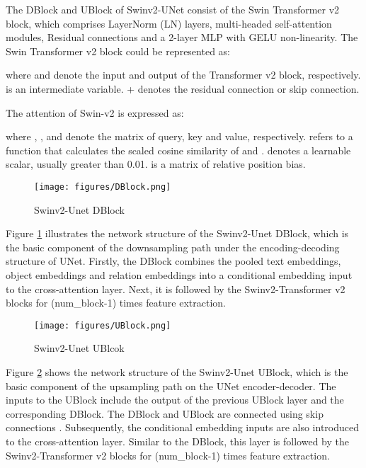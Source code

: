\documentclass{article}
\begin{document}
The DBlock and UBlock of Swinv2-UNet consist of the Swin Transformer v2 block, which comprises LayerNorm (LN) layers, multi-headed self-attention modules, Residual connections and a 2-layer MLP with GELU non-linearity. The Swin Transformer v2 block could be represented as:




where  and  denote the input and output of the Transformer v2 block, respectively.  is an intermediate variable. + denotes the residual connection or skip connection. 

The attention of Swin-v2 is expressed as:


where , , and  denote the matrix of query, key and value, respectively.  refers to a function that calculates the scaled cosine similarity of  and .  denotes a learnable scalar, usually greater than 0.01.  is a matrix of relative position bias.

\begin{figure}[!h]
    \centering
    \texttt{[image: figures/DBlock.png]}
    \caption{Swinv2-Unet DBlock}
    \label{fig:dbloc}
\end{figure}

Figure \ref{fig:dbloc} illustrates the network structure of the Swinv2-Unet DBlock, which is the basic component of the downsampling path under the encoding-decoding structure of UNet. Firstly, the DBlock combines the pooled text embeddings, object embeddings and relation embeddings into a conditional embedding input to the cross-attention layer. Next, it is followed by the Swinv2-Transformer v2 blocks for (num\_block-1) times feature extraction.

\begin{figure}[!h]
    \centering
    \texttt{[image: figures/UBlock.png]}
    \caption{Swinv2-Unet UBlcok}
    \label{fig:ublock}
\end{figure}

Figure \ref{fig:ublock} shows the network structure of the Swinv2-Unet UBlock, which is the basic component of the upsampling path on the UNet encoder-decoder. The inputs to the UBlock include the output of the previous UBlock layer and the corresponding DBlock. The DBlock and UBlock are connected using skip connections \cite{Zhou2020UNetRS}. Subsequently, the conditional embedding inputs are also introduced to the cross-attention layer. Similar to the DBlock, this layer is followed by the Swinv2-Transformer v2 blocks for (num\_block-1) times feature extraction.
\end{document}
